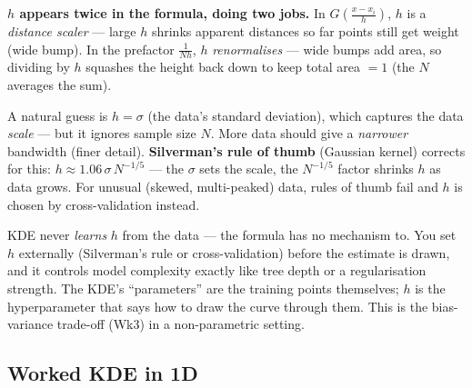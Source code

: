 \documentclass[11pt, a4paper]{article}
\begin{document}
\textbf{$h$ appears twice in the formula, doing two jobs.} In $G\!\left(\tfrac{x-x_i}{h}\right)$, $h$ is a \emph{distance scaler} — large $h$ shrinks apparent distances so far points still get weight (wide bump). In the prefactor $\tfrac{1}{Nh}$, $h$ \emph{renormalises} — wide bumps add area, so dividing by $h$ squashes the height back down to keep total area $=1$ (the $N$ averages the sum).

\begin{notebox}
A natural guess is $h=\sigma$ (the data's standard deviation), which captures the data \emph{scale} --- but it ignores sample size $N$. More data should give a \emph{narrower} bandwidth (finer detail). \textbf{Silverman's rule of thumb} (Gaussian kernel) corrects for this: $h \approx 1.06\,\sigma\,N^{-1/5}$ --- the $\sigma$ sets the scale, the $N^{-1/5}$ factor shrinks $h$ as data grows. For unusual (skewed, multi-peaked) data, rules of thumb fail and $h$ is chosen by cross-validation instead.
\end{notebox}

\begin{trapbox}
KDE never \emph{learns} $h$ from the data --- the formula has no mechanism to. You set $h$ externally (Silverman's rule or cross-validation) before the estimate is drawn, and it controls model complexity exactly like tree depth or a regularisation strength. The KDE's ``parameters'' are the training points themselves; $h$ is the hyperparameter that says how to draw the curve through them. This is the bias-variance trade-off (Wk3) in a non-parametric setting.
\end{trapbox}

\subsection{Worked KDE in 1D}
\end{document}
